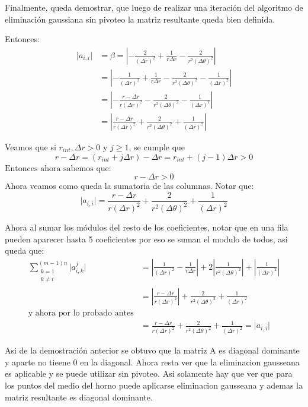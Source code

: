 \documentclass[12pt]{article}
\begin{document}
	Finalmente, queda demostrar, que luego de realizar una iteración del algoritmo de eliminación gaussiana sin pivoteo la matriz resultante queda bien definida.
	
	
	Entonces:
	\[ \begin{split}
		\lvert a_{i,i} \rvert &= \beta  = \left \vert - \frac{2}{(\Delta r)^2} + \frac{1}{r \Delta r} - \frac{2}{r^2 (\Delta \theta)^2} \right \vert \\
		&= \left \vert - \frac{1}{(\Delta r)^2} + \frac{1}{r \Delta r} - \frac{2}{r^2 (\Delta \theta)^2} - \frac{1}{(\Delta r)^2} \right \vert \\
		&= \left \vert - \frac{r - \Delta r}{r (\Delta r)^2} - \frac{2}{r^2 (\Delta \theta)^2} - \frac{1}{(\Delta r)^2} \right \vert \\
		&= \left \vert \frac{r - \Delta r}{r (\Delta r)^2} + \frac{2}{r^2 (\Delta \theta)^2} + \frac{1}{(\Delta r)^2} \right \vert
	\end{split} \]
	
	Veamos que si $r_{int}, \Delta r > 0$ y $j \geq 1$, se cumple que
	\[ r - \Delta r = (r_{int} + j \Delta r) - \Delta r = r_{int} + (j - 1) \Delta r > 0\]
	$\text{Entonces ahora sabemos que:}$
	\[ r - \Delta r > 0\]
	Ahora veamos como queda la sumatoria de las columnas. Notar que:	
	\[ \lvert a_{i,i} \rvert = \frac{r - \Delta r}{r (\Delta r)^2} + \frac{2}{r^2 (\Delta \theta)^2} + \frac{1}{(\Delta r)^2} \]
	
	Ahora al sumar los módulos del resto de los coeficientes, notar que en una fila pueden aparecer hasta 5 coeficientes por eso se suman el modulo de todos, asi queda que:
	\[ \begin{split}
		\sum_{\substack{k=1 \\ k \neq i}}^{(m-1)n} \vert a^{j}_{i,k} \vert &= \left \vert \frac{1}{(\Delta r)^2} - \frac{1}{r \Delta r} \right \vert + 2 \left \vert \frac{1}{r^2 (\Delta \theta)^2} \right \vert + \left \vert \frac{1}{(\Delta r)^2} \right \vert \\
		&= \left \vert \frac{r - \Delta r}{r (\Delta r)^2} \right \vert + \frac{2}{r^2 (\Delta \theta)^2} + \frac{1}{(\Delta r)^2} \\
		\text{y ahora por lo probado antes} \\
		&= \frac{r - \Delta r}{r (\Delta r)^2} + \frac{2}{r^2 (\Delta \theta)^2} + \frac{1}{(\Delta r)^2} = \rvert a_{i,i} \lvert
	\end{split} \]
	
	Asi de la demostración anterior se obtuvo que la matriz A es diagonal dominante y aparte no tieene 0 en la diagonal. Ahora resta ver que la eliminacion gausseana es aplicable y se puede utilizar sin pivoteo. Asi solamente hay que ver que para los puntos del medio del horno puede aplicarse eliminacion gausseana y ademas la matriz resultante es diagonal dominante. 
	
\end{document}
